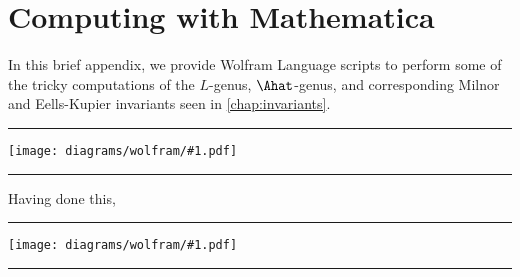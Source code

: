 \newcommand{\wolfram}[1]{
  \noindent
  \begin{center}\rule{\textwidth}{1.2pt}\end{center}
  \texttt{[image: diagrams/wolfram/\#1.pdf]}
  \vspace{-1em}
  \begin{center}\rule{\textwidth}{1.2pt}\end{center}
}

\chapter{Computing with Mathematica}\label{chap:wolfram}

In this brief appendix, we provide Wolfram Language scripts to perform some of the tricky computations of the $L$-genus, $\Ahat$-genus, and corresponding Milnor and Eells-Kupier invariants seen in \cref{chap:invariants}.

\wolfram{multseq}

Having done this,

\wolfram{characteristic}
